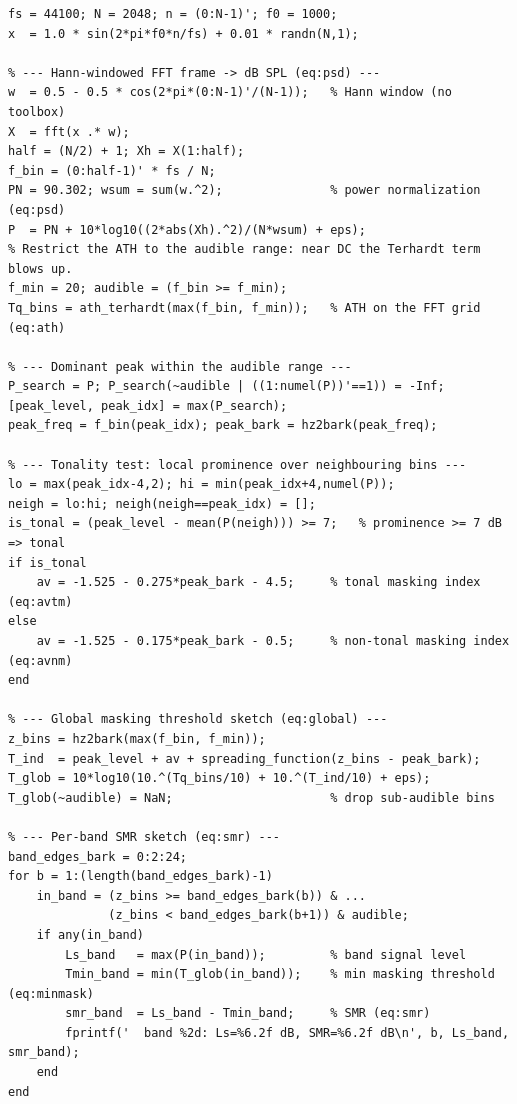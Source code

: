 \documentclass[11pt,a4paper]{article}
\begin{document}
\begin{lstlisting}[caption={demo\_psychoacoustic.m --- driver excerpt: FFT, SPL normalization, masking threshold, SMR},label={lst:demo}]
% --- Synthetic test signal: 1 kHz tone + white noise ---
fs = 44100; N = 2048; n = (0:N-1)'; f0 = 1000;
x  = 1.0 * sin(2*pi*f0*n/fs) + 0.01 * randn(N,1);

% --- Hann-windowed FFT frame -> dB SPL (eq:psd) ---
w  = 0.5 - 0.5 * cos(2*pi*(0:N-1)'/(N-1));   % Hann window (no toolbox)
X  = fft(x .* w);
half = (N/2) + 1; Xh = X(1:half);
f_bin = (0:half-1)' * fs / N;
PN = 90.302; wsum = sum(w.^2);               % power normalization (eq:psd)
P  = PN + 10*log10((2*abs(Xh).^2)/(N*wsum) + eps);
% Restrict the ATH to the audible range: near DC the Terhardt term blows up.
f_min = 20; audible = (f_bin >= f_min);
Tq_bins = ath_terhardt(max(f_bin, f_min));   % ATH on the FFT grid (eq:ath)

% --- Dominant peak within the audible range ---
P_search = P; P_search(~audible | ((1:numel(P))'==1)) = -Inf;
[peak_level, peak_idx] = max(P_search);
peak_freq = f_bin(peak_idx); peak_bark = hz2bark(peak_freq);

% --- Tonality test: local prominence over neighbouring bins ---
lo = max(peak_idx-4,2); hi = min(peak_idx+4,numel(P));
neigh = lo:hi; neigh(neigh==peak_idx) = [];
is_tonal = (peak_level - mean(P(neigh))) >= 7;   % prominence >= 7 dB => tonal
if is_tonal
    av = -1.525 - 0.275*peak_bark - 4.5;     % tonal masking index (eq:avtm)
else
    av = -1.525 - 0.175*peak_bark - 0.5;     % non-tonal masking index (eq:avnm)
end

% --- Global masking threshold sketch (eq:global) ---
z_bins = hz2bark(max(f_bin, f_min));
T_ind  = peak_level + av + spreading_function(z_bins - peak_bark);
T_glob = 10*log10(10.^(Tq_bins/10) + 10.^(T_ind/10) + eps);
T_glob(~audible) = NaN;                      % drop sub-audible bins

% --- Per-band SMR sketch (eq:smr) ---
band_edges_bark = 0:2:24;
for b = 1:(length(band_edges_bark)-1)
    in_band = (z_bins >= band_edges_bark(b)) & ...
              (z_bins < band_edges_bark(b+1)) & audible;
    if any(in_band)
        Ls_band   = max(P(in_band));         % band signal level
        Tmin_band = min(T_glob(in_band));    % min masking threshold (eq:minmask)
        smr_band  = Ls_band - Tmin_band;     % SMR (eq:smr)
        fprintf('  band %2d: Ls=%6.2f dB, SMR=%6.2f dB\n', b, Ls_band, smr_band);
    end
end
\end{lstlisting}
\end{document}
